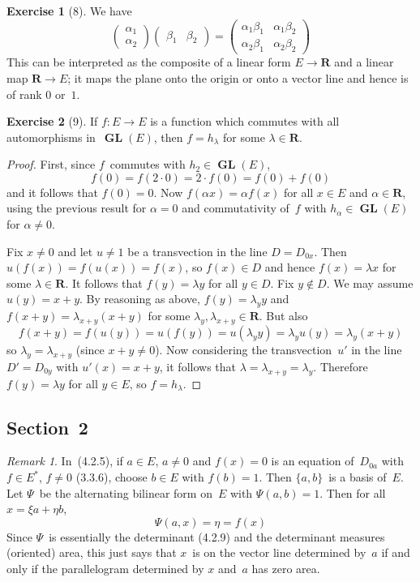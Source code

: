 \documentclass[letterpaper,12pt]{article}
\newcommand{\R}{\mathbf{R}}
\newcommand{\mult}{\cdot}
\DeclareMathOperator{\GL}{\mathbf{GL}}
\newcommand{\dual}[1]{#1^*}
\theoremstyle{definition}
\newtheorem*{exer}{Exercise}
\theoremstyle{remark}
\newtheorem*{rmk}{Remark}
\begin{document}
\begin{exer}[8]
We have
\[\begin{pmatrix}
\alpha_1\\
\alpha_2
\end{pmatrix}
\begin{pmatrix}
\beta_1&\beta_2
\end{pmatrix}
=
\begin{pmatrix}
\alpha_1\beta_1&\alpha_1\beta_2\\
\alpha_2\beta_1&\alpha_2\beta_2
\end{pmatrix}\]
This can be interpreted as the composite of a linear form \(E\to\R\) and a linear map \(\R\to E\); it maps the plane onto the origin or onto a vector line and hence is of rank \(0\) or~\(1\).
\end{exer}

\begin{exer}[9]
If \(f:E\to E\) is a function which commutes with all automorphisms in~\(\GL(E)\), then \(f=h_{\lambda}\) for some \(\lambda\in\R\).
\end{exer}
\begin{proof}
First, since \(f\)~commutes with \(h_2\in\GL(E)\),
\[f(0)=f(2\mult 0)=2\mult f(0)=f(0)+f(0)\]
and it follows that \(f(0)=0\). Now \(f(\alpha x)=\alpha f(x)\) for all \(x\in E\) and \(\alpha\in\R\), using the previous result for \(\alpha=0\) and commutativity of~\(f\) with \(h_{\alpha}\in\GL(E)\) for \(\alpha\ne0\).

Fix \(x\ne 0\) and let \(u\ne 1\) be a transvection in the line \(D=D_{0x}\). Then \(u(f(x))=f(u(x))=f(x)\), so \(f(x)\in D\) and hence \(f(x)=\lambda x\) for some \(\lambda\in\R\). It follows that \(f(y)=\lambda y\) for all \(y\in D\). Fix \(y\not\in D\). We may assume \(u(y)=x+y\). By reasoning as above, \(f(y)=\lambda_y y\) and \(f(x+y)=\lambda_{x+y}(x+y)\) for some \(\lambda_y,\lambda_{x+y}\in\R\). But also
\[f(x+y)=f(u(y))=u(f(y))=u(\lambda_y y)=\lambda_y u(y)=\lambda_y(x+y)\]
so \(\lambda_y=\lambda_{x+y}\) (since \(x+y\ne 0\)). Now considering the transvection~\(u'\) in the line \(D'=D_{0y}\) with \(u'(x)=x+y\), it follows that \(\lambda=\lambda_{x+y}=\lambda_y\). Therefore \(f(y)=\lambda y\) for all \(y\in E\), so \(f=h_{\lambda}\).
\end{proof}

\subsection*{Section~2}
\begin{rmk}
In~(4.2.5), if \(a\in E\), \(a\ne 0\) and \(f(x)=0\) is an equation of~\(D_{0a}\) with \(f\in\dual{E}\), \(f\ne 0\) (3.3.6), choose \(b\in E\) with \(f(b)=1\). Then \(\{a,b\}\)~is a basis of~\(E\). Let \(\Psi\)~be the alternating bilinear form on~\(E\) with \(\Psi(a,b)=1\). Then for all \(x=\xi a+\eta b\),
\[\Psi(a,x)=\eta=f(x)\]
Since \(\Psi\)~is essentially the determinant (4.2.9) and the determinant measures (oriented) area, this just says that \(x\)~is on the vector line determined by~\(a\) if and only if the parallelogram determined by \(x\) and~\(a\) has zero area.
\end{rmk}
\end{document}
